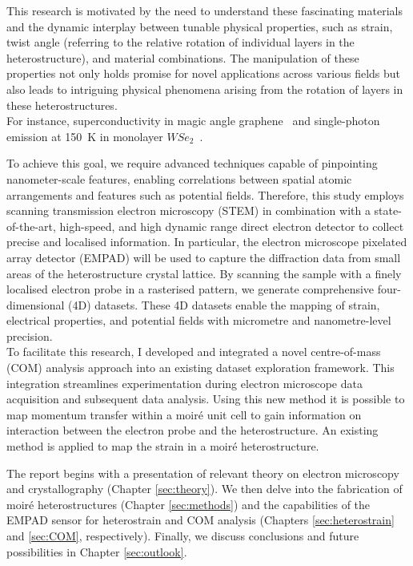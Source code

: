 This research is motivated by the need to understand these fascinating materials and the dynamic interplay between tunable physical properties, such as strain, twist angle (referring to the relative rotation of individual layers in the heterostructure), and material combinations. The manipulation of these properties not only holds promise for novel applications across various fields but also leads to intriguing physical phenomena arising from the rotation of layers in these heterostructures.\\

For instance, superconductivity in magic angle graphene~\cite{caoUnconventionalSuperconductivityMagicangle2018} and single-photon emission at \SI{150}{\kelvin} in monolayer $WSe_2$~\cite{partoDefectStrainEngineering2021}.

To achieve this goal, we require advanced techniques capable of pinpointing nanometer-scale features, enabling correlations between spatial atomic arrangements and features such as potential fields. Therefore, this study employs scanning transmission electron microscopy (STEM) in combination with a state-of-the-art, high-speed, and high dynamic range direct electron detector to collect precise and localised information. In particular, the electron microscope pixelated array detector (EMPAD) will be used to capture the diffraction data from small areas of the heterostructure crystal lattice. By scanning the sample with a finely localised electron probe in a rasterised pattern, we generate comprehensive four-dimensional (4D) datasets. These 4D datasets enable the mapping of strain, electrical properties, and potential fields with micrometre and nanometre-level precision.\\

To facilitate this research, I developed and integrated a novel centre-of-mass (COM) analysis approach into an existing dataset exploration framework. This integration streamlines experimentation during electron microscope data acquisition and subsequent data analysis. Using this new method it is possible to map momentum transfer within a moiré unit cell to gain information on interaction between the electron probe and the heterostructure. An existing method is applied to map the strain in a moiré heterostructure.

The report begins with a presentation of relevant theory on electron microscopy and crystallography (Chapter \ref{sec:theory}). We then delve into the fabrication of moir\'e heterostructures (Chapter \ref{sec:methods}) and the capabilities of the EMPAD sensor for heterostrain and COM analysis (Chapters \ref{sec:heterostrain} and \ref{sec:COM}, respectively). Finally, we discuss conclusions and future possibilities in Chapter \ref{sec:outlook}.

